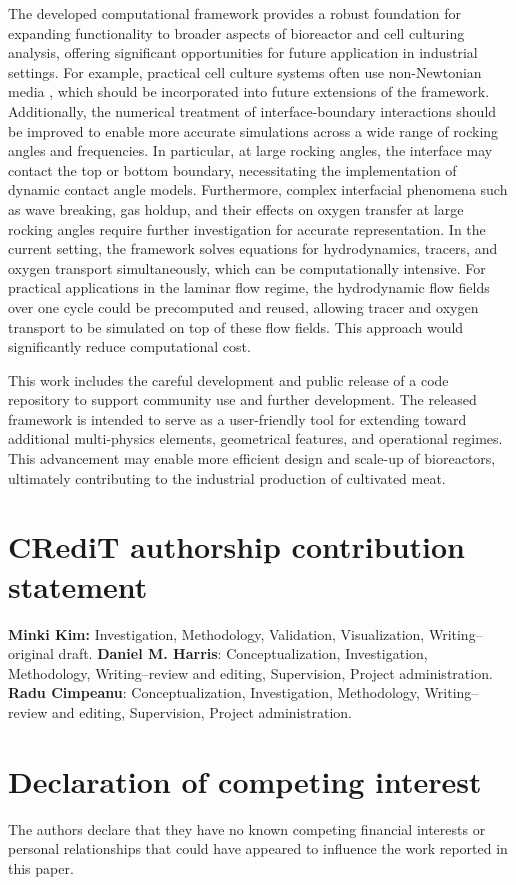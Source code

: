 \documentclass[final,3p,times,twocolumn,authoryear]{elsarticle}
\theoremstyle{definition}
\begin{document}
The developed computational framework provides a robust foundation for expanding functionality to broader aspects of bioreactor and cell culturing analysis, offering significant opportunities for future application in industrial settings. For example, practical cell culture systems often use non-Newtonian media \citep{Wyma2018,Zhang2025}, which should be incorporated into future extensions of the framework. Additionally, the numerical treatment of interface-boundary interactions should be improved to enable more accurate simulations across a wide range of rocking angles and frequencies. In particular, at large rocking angles, the interface may contact the top or bottom boundary, necessitating the implementation of dynamic contact angle models. Furthermore, complex interfacial phenomena such as wave breaking, gas holdup, and their effects on oxygen transfer at large rocking angles require further investigation for accurate representation. In the current setting, the framework solves equations for hydrodynamics, tracers, and oxygen transport simultaneously, which can be computationally intensive. For practical applications in the laminar flow regime, the hydrodynamic flow fields over one cycle could be precomputed and reused, allowing tracer and oxygen transport to be simulated on top of these flow fields. This approach would significantly reduce computational cost.

This work includes the careful development and public release of a code repository to support community use and further development. The released framework is intended to serve as a user-friendly tool for extending toward additional multi-physics elements, geometrical features, and operational regimes. This advancement may enable more efficient design and scale-up of bioreactors, ultimately contributing to the industrial production of cultivated meat.


\section*{CRediT authorship contribution statement}

\textbf{Minki Kim:} Investigation, Methodology, Validation, Visualization, Writing--original draft.
\textbf{Daniel M. Harris}: Conceptualization, Investigation, Methodology, Writing--review and editing, Supervision, Project administration.
\textbf{Radu Cimpeanu}: Conceptualization, Investigation, Methodology, Writing--review and editing, Supervision, Project administration.

\section*{Declaration of competing interest}
The authors declare that they have no known competing financial interests or personal relationships that could have appeared to influence the work reported in this paper.
\end{document}
